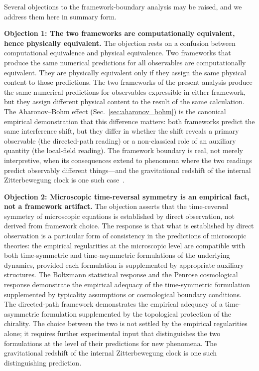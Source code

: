 \documentclass[%
 reprint, amsmath,amssymb, aps, prb, ]{revtex4-2}
\numberwithin{equation}{section}
\begin{document}
Several objections to the framework-boundary analysis may be raised, and we address them here in summary form.

\textbf{Objection 1: The two frameworks are computationally equivalent, hence physically equivalent.} The objection rests on a confusion between computational equivalence and physical equivalence. Two frameworks that produce the same numerical predictions for all observables are computationally equivalent. They are physically equivalent only if they assign the same physical content to those predictions. The two frameworks of the present analysis produce the same numerical predictions for observables expressible in either framework, but they assign different physical content to the result of the same calculation. The Aharonov--Bohm effect (Sec.~\ref{sec:aharonov_bohm}) is the canonical empirical demonstration that this difference matters: both frameworks predict the same interference shift, but they differ in whether the shift reveals a primary observable (the directed-path reading) or a non-classical role of an auxiliary quantity (the local-field reading). The framework boundary is real, not merely interpretive, when its consequences extend to phenomena where the two readings predict observably different things---and the gravitational redshift of the internal Zitterbewegung clock is one such case~\cite{hanamura22, hanamura55}.

\textbf{Objection 2: Microscopic time-reversal symmetry is an empirical fact, not a framework artifact.} The objection asserts that the time-reversal symmetry of microscopic equations is established by direct observation, not derived from framework choice. The response is that what is established by direct observation is a particular form of consistency in the predictions of microscopic theories: the empirical regularities at the microscopic level are compatible with both time-symmetric and time-asymmetric formulations of the underlying dynamics, provided each formulation is supplemented by appropriate auxiliary structures. The Boltzmann statistical response and the Penrose cosmological response demonstrate the empirical adequacy of the time-symmetric formulation supplemented by typicality assumptions or cosmological boundary conditions. The directed-path framework demonstrates the empirical adequacy of a time-asymmetric formulation supplemented by the topological protection of the chirality. The choice between the two is not settled by the empirical regularities alone; it requires further experimental input that distinguishes the two formulations at the level of their predictions for new phenomena. The gravitational redshift of the internal Zitterbewegung clock is one such distinguishing prediction.
\end{document}
